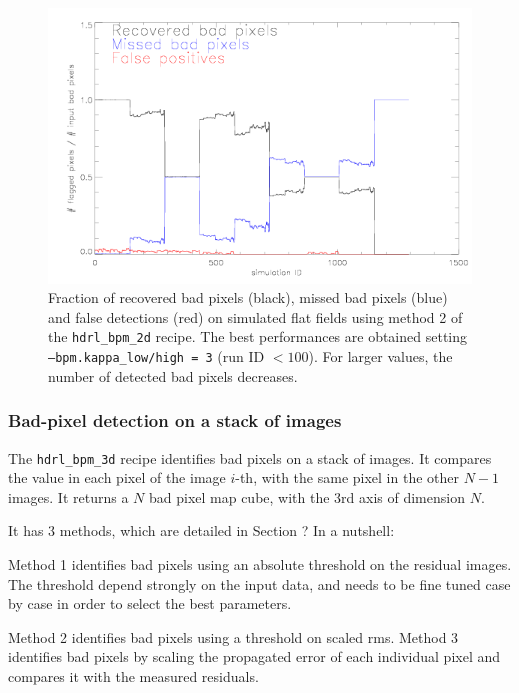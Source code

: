 \begin{figure}
 \subfigure
\includegraphics[width=17cm]{figures/recovered_bad_pixels_m2.png}
 \caption{Fraction of recovered bad pixels (black), missed bad pixels
   (blue) and false detections (red) on simulated flat fields using
   method 2 of the {\tt hdrl\_bpm\_2d} recipe. The best performances
   are obtained setting {\tt --bpm.kappa\_low/high = 3} (run ID $<
   100$). For larger values, the number of detected bad pixels
   decreases.}
\label{fig:single_m2}
\end{figure}



\subsubsection{Bad-pixel detection on a stack of images}

The {\tt hdrl\_bpm\_3d} recipe identifies bad pixels on a stack of
images. It compares the value in each pixel of the image $i$-th, with
the same pixel in the other $N-1$ images. It returns a $N$ bad pixel
map cube, with the 3rd axis of dimension $N$.

It has 3 methods, which are detailed in Section ? In a nutshell: 

Method 1 identifies bad pixels using an absolute threshold on
the residual images. The threshold depend strongly on the input data,
and needs to be fine tuned case by case in order to select the best
parameters.

Method 2 identifies bad pixels using a threshold on scaled rms. Method
3 identifies bad pixels by scaling the propagated error of each
individual pixel and compares it with the measured residuals.

